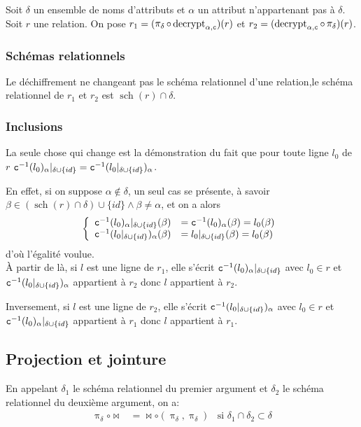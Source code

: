 \documentclass[french]{article}
\DeclareMathOperator{\proj}{\pi}
\DeclareMathOperator{\decrypt}{decrypt}
\DeclareMathOperator{\s}{sch}
\newcommand\typeT[1]{\text{\ttfamily #1}}
\newcommand{\decryptArgs}[2]{\decrypt_{#1 , \typeT{#2}}}
\newcommand{\projDelta}{\proj_{\delta}}
\newcommand{\dc}[1]{\typeT{c}^{-1}(#1)}
\newcommand{\cip}{\cup \{id\}}
\newcommand{\intro}[2]{Soit $r$ une relation. On pose $r_1 = (#1)(r) $ et $r_2 = (#2)(r) $}
\begin{document}
Soit $\delta$ un ensemble de noms d'attributs
et $\alpha$ un attribut n'appartenant pas à $\delta$.
\intro{\projDelta \circ \decryptArgs{\alpha}{c}}{\decryptArgs{\alpha}{c} \circ \projDelta}.

\subsubsection*{Schémas relationnels}
Le déchiffrement ne changeant pas le schéma relationnel
d'une relation,le schéma relationnel de $r_1$ et $r_2$
est $\s(r) \cap \delta$.

\subsubsection*{Inclusions}
La seule chose qui change est la démonstration du fait que 
pour toute ligne $l_0$ de $r$
$\dc{l_0}_\alpha|_{\delta \cip} = \dc{l_0|_{\delta \cip}}_\alpha$.

En effet, si on suppose $\alpha \notin \delta$, un seul cas se présente,
à savoir
$\beta \in (\s(r) \cap \delta) \cip \wedge \beta \neq \alpha$, et on a alors
$$
\left\lbrace
\begin{array}{ll}
\dc{l_0}_\alpha|_{\delta \cip}(\beta) 
& = \dc{l_0}_\alpha(\beta) = l_0(\beta) \\
\dc{l_0|_{\delta \cip}}_\alpha (\beta)
& = l_0|_{\delta \cip}(\beta) = l_0(\beta)
\end{array}
\right.
$$
d'où l'égalité voulue. \\

À partir de là, si $l$ est une ligne de $r_1$,
elle s'écrit $\dc{l_0}_\alpha|_{\delta \cip}$
avec $l_0 \in r$ et $\dc{l_0|_{\delta \cip}}_\alpha$
appartient à $r_2$ donc $l$ appartient à $r_2$.

Inversement, si $l$ est une ligne de $r_2$,
elle s'écrit $\dc{l_0|_{\delta \cip}}_\alpha$
avec $l_0 \in r$ et $\dc{l_0}_\alpha|_{\delta \cip}$
appartient à $r_1$ donc $l$ appartient à $r_1$.

\subsection*{Projection et jointure}
En appelant $\delta_1$ le schéma relationnel du premier
argument et $\delta_2$ le schéma relationnel du deuxième argument,
on a:
\begin{align}
\projDelta \circ \Join
& = \Join \circ (\projDelta, \projDelta)
& \text{si $\delta_1 \cap \delta_2 \subset \delta$}
\end{align}
\end{document}
